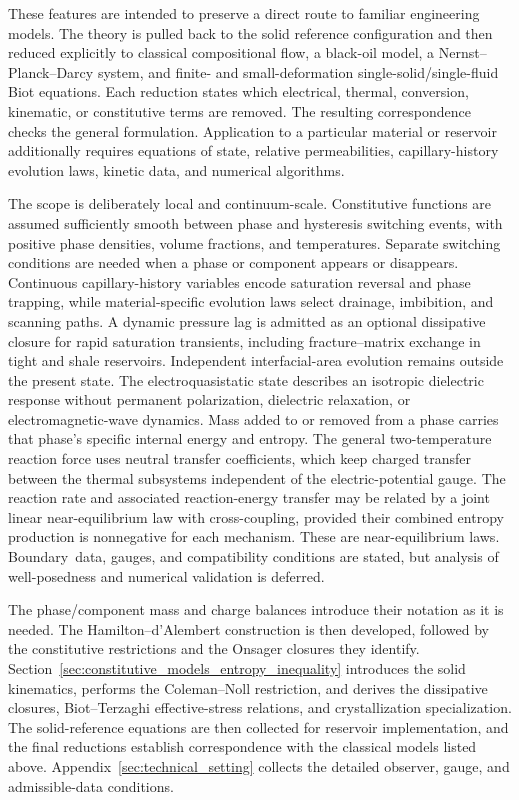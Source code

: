 %
These features are intended to preserve a direct route to familiar engineering
models.  The theory is pulled back to the solid reference configuration and
then reduced explicitly to classical compositional flow, a black-oil model, a
Nernst--Planck--Darcy system, and finite- and small-deformation
single-solid/single-fluid Biot equations.  Each reduction states which
electrical, thermal, conversion, kinematic, or constitutive terms are removed.
The resulting correspondence checks the general formulation.  Application to a
particular material or reservoir additionally requires equations of state,
relative permeabilities, capillary-history evolution laws, kinetic data, and
numerical algorithms.

The scope is deliberately local and continuum-scale.  Constitutive functions
are assumed sufficiently smooth between phase and hysteresis switching events,
with positive phase densities, volume fractions, and temperatures.  Separate
switching conditions are needed when a phase or component appears or
disappears.  Continuous capillary-history variables encode saturation reversal
and phase trapping, while material-specific evolution laws select drainage,
imbibition, and scanning paths.  A dynamic pressure lag is admitted as an
optional dissipative closure for rapid saturation transients, including
fracture--matrix exchange in tight and shale reservoirs.  Independent
interfacial-area evolution remains outside the present state.  The
electroquasistatic state describes an isotropic
dielectric response without permanent polarization, dielectric relaxation, or
electromagnetic-wave dynamics.  Mass added to or removed from a phase carries
that phase's specific internal energy and entropy.  The general two-temperature
reaction force uses neutral transfer coefficients, which keep charged transfer
between the thermal subsystems independent of the electric-potential gauge.
The reaction rate and associated reaction-energy transfer may be related by a
joint linear near-equilibrium law with cross-coupling, provided their combined
entropy production is nonnegative for each mechanism.  These are
near-equilibrium laws.  Boundary~data, gauges, and compatibility conditions
are stated, but analysis of
well-posedness and numerical validation is deferred.

The phase/component mass and charge balances introduce their notation as it is
needed.  The Hamilton--d'Alembert construction is then developed, followed by
the constitutive restrictions and the Onsager closures they identify.
Section~\ref{sec:constitutive_models_entropy_inequality} introduces the solid
kinematics, performs the Coleman--Noll restriction, and derives the
dissipative closures, Biot--Terzaghi effective-stress relations, and
crystallization specialization.
The solid-reference equations are then collected for reservoir implementation,
and the final reductions establish correspondence with the classical models
listed above.  Appendix~\ref{sec:technical_setting} collects the detailed
observer, gauge, and admissible-data conditions.
